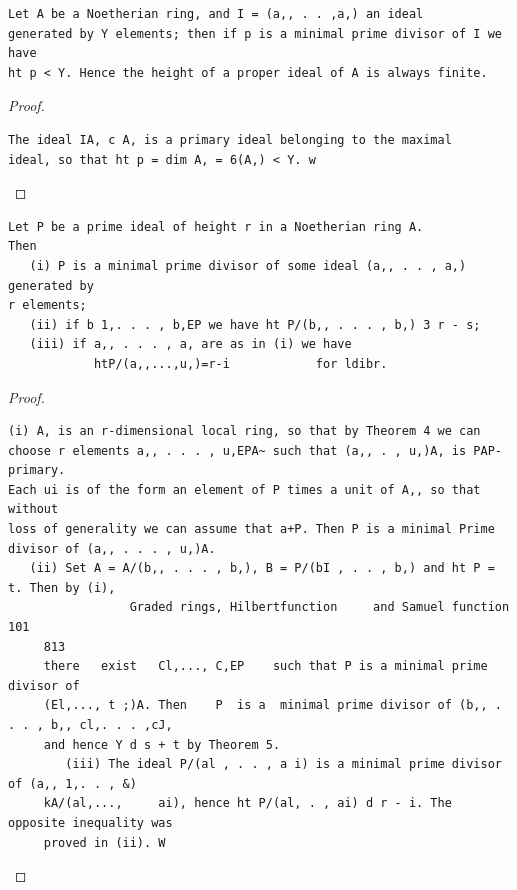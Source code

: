 \begin{theorem}\label{mcrt-auto-theorem-13-5}\uses{}
\begin{verbatim}
Let A be a Noetherian ring, and I = (a,, . . ,a,) an ideal
generated by Y elements; then if p is a minimal prime divisor of I we have
ht p < Y. Hence the height of a proper ideal of A is always finite.
\end{verbatim}
\end{theorem}
\begin{proof}
\begin{verbatim}
The ideal IA, c A, is a primary ideal belonging to the maximal
ideal, so that ht p = dim A, = 6(A,) < Y. w
\end{verbatim}
\end{proof}


\begin{theorem}\label{mcrt-auto-theorem-13-6}\uses{}
\begin{verbatim}
Let P be a prime ideal of height r in a Noetherian ring A.
Then
   (i) P is a minimal prime divisor of some ideal (a,, . . , a,) generated by
r elements;
   (ii) if b 1,. . . , b,EP we have ht P/(b,, . . . , b,) 3 r - s;
   (iii) if a,, . . . , a, are as in (i) we have
            htP/(a,,...,u,)=r-i            for ldibr.
\end{verbatim}
\end{theorem}
\begin{proof}
\begin{verbatim}
(i) A, is an r-dimensional local ring, so that by Theorem 4 we can
choose r elements a,, . . . , u,EPA~ such that (a,, . , u,)A, is PAP-primary.
Each ui is of the form an element of P times a unit of A,, so that without
loss of generality we can assume that a+P. Then P is a minimal Prime
divisor of (a,, . . . , u,)A.
   (ii) Set A = A/(b,, . . . , b,), B = P/(bI , . . , b,) and ht P = t. Then by (i),
                 Graded rings, Hilbertfunction     and Samuel function                   101
     813
     there   exist   Cl,..., C,EP    such that P is a minimal prime divisor of
     (El,..., t ;)A. Then    P  is a  minimal prime divisor of (b,, . . . , b,, cl,. . . ,cJ,
     and hence Y d s + t by Theorem 5.
        (iii) The ideal P/(al , . . , a i) is a minimal prime divisor of (a,, 1,. . , &)
     kA/(al,...,     ai), hence ht P/(al, . , ai) d r - i. The opposite inequality was
     proved in (ii). W
\end{verbatim}
\end{proof}


